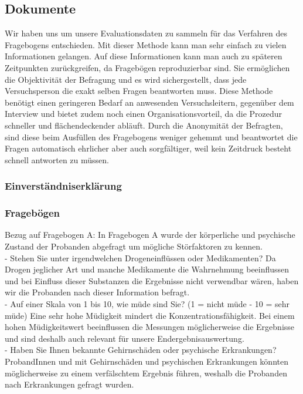 \documentclass{Bericht}
\begin{document}
\subsection{Dokumente}

Wir haben uns um unsere Evaluationsdaten zu sammeln für das Verfahren des Fragebogens entschieden. Mit dieser Methode kann man sehr einfach zu vielen Informationen gelangen. Auf diese Informationen kann man auch zu späteren Zeitpunkten zurückgreifen, da Fragebögen reproduzierbar sind. Sie ermöglichen die Objektivität der Befragung und es wird sichergestellt, dass jede Versuchsperson die exakt selben Fragen beantworten muss. Diese Methode benötigt einen geringeren Bedarf an anwesenden Versuchsleitern, gegenüber dem Interview und bietet zudem noch einen Organisationsvorteil, da die Prozedur schneller und flächendeckender abläuft. Durch die Anonymität der Befragten, sind diese beim Ausfüllen des Fragebogens weniger gehemmt und beantwortet die Fragen automatisch ehrlicher aber auch sorgfältiger, weil kein Zeitdruck besteht schnell antworten zu müssen.

\subsubsection{Einverständniserklärung}

\subsubsection{Fragebögen}
Bezug auf \glqq Fragebogen A\grqq: 
In  \glqq Fragebogen A\grqq{} wurde der körperliche und psychische Zustand der Probanden abgefragt um mögliche Störfaktoren zu kennen. \\

- Stehen Sie unter irgendwelchen Drogeneinflüssen oder Medikamenten?
Da Drogen jeglicher Art und manche Medikamente die Wahrnehmung beeinflussen und bei Einfluss dieser Substanzen die Ergebnisse nicht verwendbar wären, haben wir die Probanden nach dieser Information befragt. \\

- Auf einer Skala von 1 bis 10, wie müde sind Sie? (1 = nicht müde - 10 = sehr müde)
Eine sehr hohe Müdigkeit mindert die Konzentrationsfähigkeit. Bei einem hohen Müdigkeitswert beeinflussen die Messungen möglicherweise die Ergebnisse und sind deshalb auch relevant für unsere Endergebnisauswertung. \\

- Haben Sie Ihnen bekannte Gehirnschäden oder psychische Erkrankungen?
ProbandInnen und mit Gehirnschäden und psychischen Erkrankungen könnten möglicherweise zu einem verfälschtem Ergebnis führen, weshalb die Probanden nach Erkrankungen gefragt wurden. \\
\end{document}

